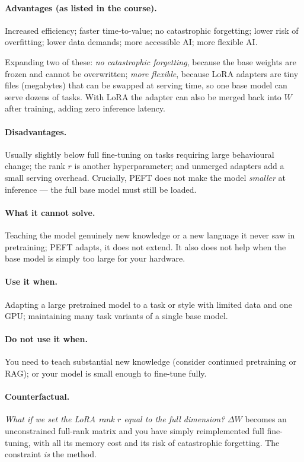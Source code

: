 \documentclass[11pt,a4paper]{article}
\begin{document}
\paragraph{Advantages (as listed in the course).} Increased efficiency; faster time-to-value;
no catastrophic forgetting; lower risk of overfitting; lower data demands; more accessible AI;
more flexible AI.

Expanding two of these: \emph{no catastrophic forgetting}, because the base weights are frozen
and cannot be overwritten; \emph{more flexible}, because LoRA adapters are tiny files
(megabytes) that can be swapped at serving time, so one base model can serve dozens of tasks.
With LoRA the adapter can also be merged back into $W$ after training, adding zero inference
latency.

\paragraph{Disadvantages.} Usually slightly below full fine-tuning on tasks requiring large
behavioural change; the rank $r$ is another hyperparameter; and unmerged adapters add a small
serving overhead. Crucially, PEFT does not make the model \emph{smaller} at inference --- the
full base model must still be loaded.

\paragraph{What it cannot solve.} Teaching the model genuinely new knowledge or a new language
it never saw in pretraining; PEFT adapts, it does not extend. It also does not help when the
base model is simply too large for your hardware.

\paragraph{Use it when.} Adapting a large pretrained model to a task or style with limited
data and one GPU; maintaining many task variants of a single base model.
\paragraph{Do not use it when.} You need to teach substantial new knowledge (consider
continued pretraining or RAG); or your model is small enough to fine-tune fully.

\paragraph{Counterfactual.} \emph{What if we set the LoRA rank $r$ equal to the full
dimension?} $\Delta W$ becomes an unconstrained full-rank matrix and you have simply
reimplemented full fine-tuning, with all its memory cost and its risk of catastrophic
forgetting. The constraint \emph{is} the method.
\end{document}
